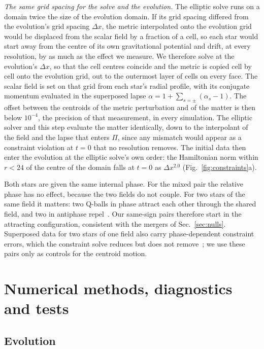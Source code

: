 \documentclass[twocolumn,floatfix,aps,prd,superscriptaddress,nofootinbib]{revtex4-2}
\begin{document}
\emph{The same grid spacing for the solve and the evolution.} The elliptic solve runs on a domain twice the size of the evolution domain. If its grid spacing differed from the evolution's grid spacing $\Delta x$, the metric interpolated onto the evolution grid would be displaced from the scalar field by a fraction of a cell, so each star would start away from the centre of its own gravitational potential and drift, at every resolution, by as much as the effect we measure. We therefore solve at the evolution's $\Delta x$, so that the cell centres coincide and the metric is copied cell by cell onto the evolution grid, out to the outermost layer of cells on every face. The scalar field is set on that grid from each star's radial profile, with its conjugate momentum evaluated in the superposed lapse $\alpha=1+\sum_{s=\pm}(\alpha_s-1)$. The offset between the centroids of the metric perturbation and of the matter is then below $10^{-4}$, the precision of that measurement, in every simulation. The elliptic solver and this step evaluate the matter identically, down to the interpolant of the field and the lapse that enters $\Pi$, since any mismatch would appear as a constraint violation at $t=0$ that no resolution removes. The initial data then enter the evolution at the elliptic solve's own order: the Hamiltonian norm within $r<24$ of the centre of the domain falls at $t=0$ as $\Delta x^{2.0}$ (Fig.~\ref{fig:constraints}a).

Both stars are given the same internal phase. For the mixed pair the relative phase has no effect, because the two fields do not couple. For two stars of the same field it matters: two Q-balls in phase attract each other through the shared field, and two in antiphase repel~\cite{battye_sutcliffe2000,palenzuela2008}. Our same-sign pairs therefore start in the attracting configuration, consistent with the mergers of Sec.~\ref{sec:nulls}. Superposed data for two stars of one field also carry phase-dependent constraint errors, which the constraint solve reduces but does not remove~\cite{helfer2022}; we use these pairs only as controls for the centroid motion.

\section{Numerical methods, diagnostics and tests}
\label{sec:setup}

\subsection{Evolution}
\end{document}
